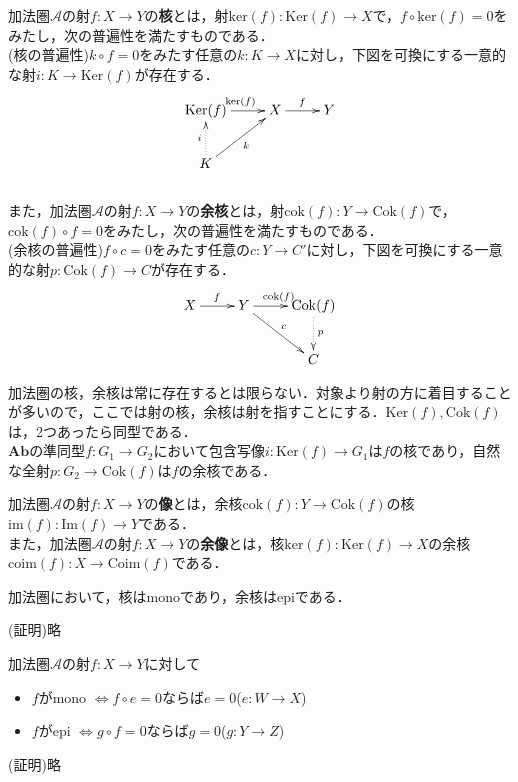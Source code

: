 \begin{defi}
加法圏$\mathcal{A}$の射$f:X \to Y$の{\bf 核}とは，射$\mathrm{ker}(f): \mathrm{Ker}(f) \to X$で，$f \circ \mathrm{ker}(f) = 0$をみたし，次の普遍性を満たすものである． \\
{\rm(核の普遍性)}\;$k \circ f = 0$をみたす任意の$k:K \to X$に対し，下図を可換にする一意的な射$i:K \to \mathrm{Ker}(f)$が存在する．
\[
\xymatrix{
\mathrm{Ker}(f) \ar[r]^{\mathrm{ker}(f)} & X \ar[r]^f &Y  \\
K \ar[ur]_{k}  \ar@{.>}[u]^i
}
\]\\

また，加法圏$\mathcal{A}$の射$f:X \to Y$の{\bf 余核}とは，射$\mathrm{cok}(f): Y \to \mathrm{Cok}(f)$で，$\mathrm{cok}(f) \circ f = 0$をみたし，次の普遍性を満たすものである． \\
{\rm(余核の普遍性)}\;$f \circ c = 0$をみたす任意の$c:Y \to C'$に対し，下図を可換にする一意的な射$p:\mathrm{Cok}(f) \to C$が存在する．
\[
\xymatrix{
X \ar[r]^f 	& Y \ar[r]^{\mathrm{cok}(f)} &\mathrm{Cok}(f) \ar@{.>}[d]^p \\
&&C \ar@{<-}[ul]_{c}  
}
\]
\end{defi} \proofend
加法圏の核，余核は常に存在するとは限らない．対象より射の方に着目することが多いので，ここでは射の核，余核は射を指すことにする．$\mathrm{Ker}(f), \mathrm{Cok}(f)$は，2つあったら同型である．\\
$\mathbf{Ab}$の準同型$f:G_1 \to G_2$において包含写像$i:\mathrm{Ker}(f) \to G_1$は$f$の核であり，自然な全射$p:G_2 \to \mathrm{Cok}(f)$は$f$の余核である．

\begin{defi}
加法圏$\mathcal{A}$の射$f:X \to Y$の{\bf 像}とは，余核$\mathrm{cok}(f): Y \to \mathrm{Cok}(f)$の核$\mathrm{im}(f): \mathrm{Im}(f) \to Y$である．\\
また，加法圏$\mathcal{A}$の射$f:X \to Y$の{\bf 余像}とは，核$\mathrm{ker}(f): \mathrm{Ker}(f) \to X$の余核$\mathrm{coim}(f): X \to \mathrm{Coim}(f) $である．
\end{defi} \proofend
\begin{prop}
加法圏において，核はmonoであり，余核はepiである．
\end{prop}
(証明)\;略\proofend
\begin{prop}
加法圏$\mathcal{A}$の射$f:X \to Y$に対して
\begin{itemize}
\item $f$がmono $\Leftrightarrow f\circ e = 0$ならば$e=0$\;($e:W \to X$)
\item $f$がepi \;\;\;\;$\Leftrightarrow g\circ f = 0$ならば$g=0$\;($g:Y \to Z$)
\end{itemize}
\end{prop}
(証明)\;略\proofend

